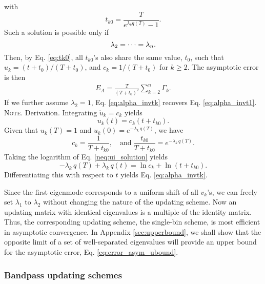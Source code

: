 \documentclass[reprint, floatfix]{revtex4-1}
\newcommand{\note}[1]{{\color{DarkGreen}\footnotesize \textsc{Note.} #1}}
\begin{document}
with
\begin{equation}
  t_{k0} = \frac{             T            }
                { e^{ \lambda_k q(T) } - 1 }.
\label{eq:tk0}
\end{equation}
%
Such a solution is possible only if
%
\begin{equation}
  \lambda_2 = \dots = \lambda_n.
  \notag
\end{equation}
%
Then, by Eq. \eqref{eq:tk0},
all $t_{k0}$'s also share the same value,
$t_0$,
such that
$u_k = (t + t_0) / (T + t_0)$,
and
$c_k = 1/(T + t_0)$
for $k \ge 2$.
%
The asymptotic error is then
\begin{align}
  E_A
  =
  \frac{       T     }
       { (T + t_0)^2 }
  \sum_{ k = 2 }^n
    \Gamma_k
  .
\label{eq:error_asym_singlebin}
\end{align}
%
If we further assume $\lambda_2 = 1$,
Eq. \eqref{eq:alpha_invtk}
recovers Eq. \eqref{eq:alpha_invt1}.
%
\note{Derivation.
  Integrating $\dot u_k = c_k$ yields
  \begin{equation}
    u_k(t) = c_k \left(t + t_{k0} \right).
  \tag{UK}
  \label{neq:ui_solution}
  \end{equation}
  Given that $u_k(T) = 1$ and $u_k(0) = e^{-\lambda_k \, q(T)}$,
  we have
  $$
  c_k = \frac{ 1 }{ T + t_{k0} },
  \quad
  \mathrm{and\;}
  \frac{ t_{k0} } { T + t_{k0} }
  =
  e^{ -\lambda_k \, q(T) }.
  $$
  Taking the logarithm of Eq. \eqref{neq:ui_solution} yields
  $$
  -\lambda_k \, q(T) + \lambda_k \, q(t)
  = \ln c_k + \ln \left( t + t_{k0} \right).
  $$
  Differentiating this with respect to $t$ yields
  Eq. \eqref{eq:alpha_invtk}.
}

Since the first eigenmode corresponds to
a uniform shift of all $v_k$'s,
we can freely set $\lambda_1$ to $\lambda_2$
without changing the nature of the updating scheme.
%
Now an updating matrix
with identical eigenvalues
is a multiple of the identity matrix.
%
Thus,
the corresponding updating scheme,
the single-bin scheme, is most efficient
in asymptotic convergence.
%
In Appendix \ref{sec:upperbound},
we shall show that the opposite limit of
a set of well-separated eigenvalues
will provide an upper bound for
the asymptotic error, Eq. \eqref{eq:error_asym_ubound}.



\subsubsection{\label{sec:optscheme}
Bandpass updating schemes}
\end{document}
